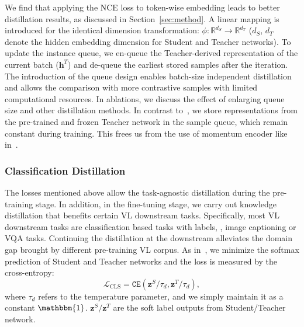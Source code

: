 We find that applying the NCE loss to token-wise embedding leads to better distillation results, as discussed in Section~\ref{sec:method}. A linear mapping is introduced for the identical dimension transformation: $\phi: \mathbb{R}^{d_S} \rightarrow \mathbb{R}^{d_T}$ ($d_S$, $d_T$ denote the hidden embedding dimension for Student and Teacher networks). 
To update the instance queue, we en-queue
the Teacher-derived representation of the current batch ($\mathbf{h}^T$) and de-queue the earliest stored samples after the iteration. The introduction of the queue design enables batch-size independent distillation and allows the comparison with more contrastive samples with limited computational resources. In ablations, we discuss the effect of enlarging queue size and other distillation methods. In contrast to~\cite{he2020momentum,sun2020contrastive}, we store representations from the pre-trained and frozen Teacher network in the sample queue, which remain constant during training. This frees us from the use of momentum encoder like in~\cite{fang2021seed}.


\subsubsection{Classification Distillation}
The losses mentioned above allow the task-agnostic distillation during the pre-training stage. In addition, in the fine-tuning stage, we carry out knowledge distillation that benefits certain VL downstream tasks. Specifically, most VL downstream tasks are classification based tasks with labels, \eg, image captioning or VQA tasks.  Continuing the distillation at the downstream alleviates the domain gap brought by different pre-training VL corpus. As in~\cite{hinton2015distilling}, we minimize the softmax prediction of Student and Teacher networks and the loss is measured by the cross-entropy:
\begin{equation}
\mathcal{L}_\text{CLS} = \texttt{CE}(\mathbf{z}^S/\tau_{d}, \mathbf{z}^T/\tau_{d}),
\end{equation}
where $\tau_d$ refers to the temperature parameter, and we simply maintain it as  a constant $\mathbbm{1}$. $\mathbf{z}^S/\mathbf{z}^T$ are the soft label outputs from Student/Teacher network.

